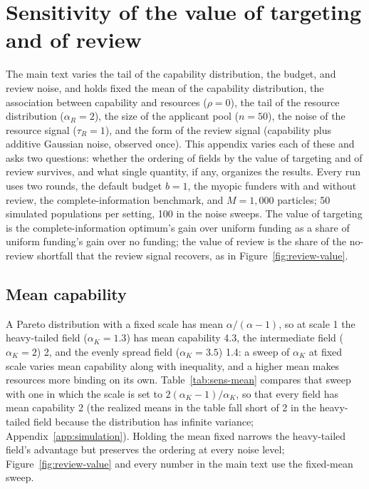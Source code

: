 \section{Sensitivity of the value of targeting and of review}\label{app:sensitivity}

The main text varies the tail of the capability distribution, the budget, and review noise, and holds fixed the mean of the capability distribution, the association between capability and resources ($\rho = 0$), the tail of the resource distribution ($\alpha_R = 2$), the size of the applicant pool ($n = 50$), the noise of the resource signal ($\tau_R = 1$), and the form of the review signal (capability plus additive Gaussian noise, observed once). This appendix varies each of these and asks two questions: whether the ordering of fields by the value of targeting and of review survives, and what single quantity, if any, organizes the results. Every run uses two rounds, the default budget $b = 1$, the myopic funders with and without review, the complete-information benchmark, and $M = 1{,}000$ particles; 50 simulated populations per setting, 100 in the noise sweeps. The value of targeting is the complete-information optimum's gain over uniform funding as a share of uniform funding's gain over no funding; the value of review is the share of the no-review shortfall that the review signal recovers, as in Figure~\ref{fig:review-value}.

\subsection*{Mean capability}
A Pareto distribution with a fixed scale has mean $\alpha/(\alpha - 1)$, so at scale 1 the heavy-tailed field ($\alpha_K = 1.3$) has mean capability 4.3, the intermediate field ($\alpha_K = 2$) 2, and the evenly spread field ($\alpha_K = 3.5$) 1.4: a sweep of $\alpha_K$ at fixed scale varies mean capability along with inequality, and a higher mean makes resources more binding on its own. Table~\ref{tab:sens-mean} compares that sweep with one in which the scale is set to $2(\alpha_K - 1)/\alpha_K$, so that every field has mean capability 2 (the realized means in the table fall short of 2 in the heavy-tailed field because the distribution has infinite variance; Appendix~\ref{app:simulation}). Holding the mean fixed narrows the heavy-tailed field's advantage but preserves the ordering at every noise level; Figure~\ref{fig:review-value} and every number in the main text use the fixed-mean sweep.

